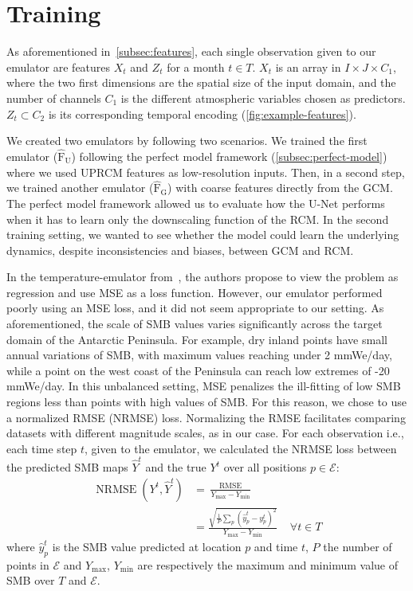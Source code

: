 \documentclass[a4paper,11pt,oneside]{report}
\begin{document}
\section{Training}\label{subsec:training}
As aforementioned in~\autoref{subsec:features}, each single observation given to our emulator are features $X_t$ and $Z_t$ for a month $t\in T$. $X_t$ is an array in $I \times J \times C_1$, where the two first dimensions are the spatial size of the input domain, and the number of channels $C_1$ is the different atmospheric variables chosen as predictors. $Z_t \subset C_2$ is its corresponding temporal encoding (\autoref{fig:example-features}).


We created two emulators by following two scenarios. We trained the first emulator ($\mathrm{\hat{F}_U}$) following the perfect model framework (\autoref{subsec:perfect-model}) where we used UPRCM features as low-resolution inputs. Then, in a second step, we trained another emulator ($\mathrm{\hat{F}_G}$) with coarse features directly from the GCM. The perfect model framework allowed us to evaluate how the U-Net performs when it has to learn only the downscaling function of the RCM. In the second training setting, we wanted to see whether the model could learn the underlying dynamics, despite inconsistencies and biases, between GCM and RCM. 


In the temperature-emulator from~\cite{Doury}, the authors propose to view the problem as regression and use MSE as a loss function. However, our emulator performed poorly using an MSE loss, and it did not seem appropriate to our setting. As aforementioned, the scale of SMB values varies significantly across the target domain of the Antarctic Peninsula. For example, dry inland points have small annual variations of SMB, with maximum values reaching under 2 \si{mmWe/day}, while a point on the west coast of the Peninsula can reach low extremes of -20 \si{mmWe/day}. In this unbalanced setting, MSE penalizes the ill-fitting of low SMB regions less than points with high values of SMB. For this reason, we chose to use a normalized RMSE (NRMSE) loss. Normalizing the RMSE facilitates comparing datasets with different magnitude scales, as in our case. For each observation i.e., each time step $t$, given to the emulator, we calculated the NRMSE loss between the predicted SMB maps $\hat{Y}^{t}$ and the true $Y^{t}$ over all positions $p \in \mathcal{E}$:
\begin{align*}
        \operatorname{NRMSE}\left(Y^{t},\hat{Y}^{t}\right) &= \frac{\operatorname{RMSE}}{Y_{\max} - Y_{\min}} \\
         &=\frac{\sqrt{\frac{1}{P}\sum_{p}(\hat{y}_{p}^{t}-y^{t}_{p})^2}}{Y_{\max} - Y_{\min}}   \;\;\;\; \forall t \in T
\end{align*}
where $\hat{y}_{p}^{t}$ is the SMB value predicted at location $p$ and time $t$, $P$ the number of points in $\mathcal{E}$ and $Y_{\max}$, $Y_{\min}$ are respectively the maximum and minimum value of SMB over $T$ and $\mathcal{E}$.
\end{document}
